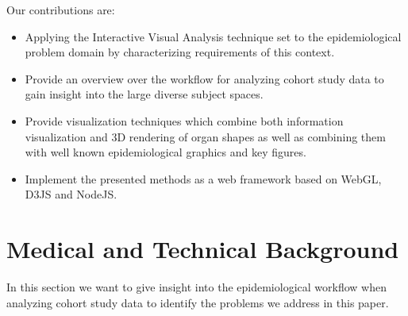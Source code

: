 \documentclass[journal]{style/vgtc} 			          %
\begin{document}
Our contributions are:
\begin{itemize}
	\item Applying the Interactive Visual Analysis technique set to the epidemiological problem domain by characterizing requirements of this context.
	\item Provide an overview over the workflow for analyzing cohort study data to gain insight into the large diverse subject spaces.
	\item Provide visualization techniques which combine both information visualization and 3D rendering of organ shapes as well as combining them with well known epidemiological graphics and key figures.
	\item Implement the presented methods as a web framework based on WebGL, D3JS and NodeJS.
\end{itemize}



\section{Medical and Technical Background} \label{MedicalAndTechnicalBackground}

In this section we want to give insight into the epidemiological workflow when analyzing cohort study data to identify the problems we address in this paper.
%
%
\end{document}
